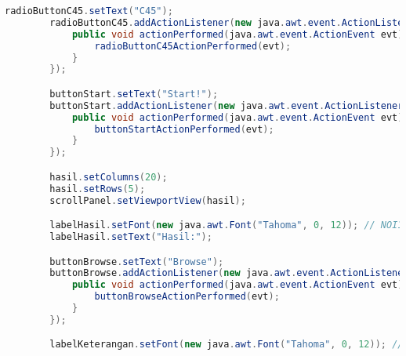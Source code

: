 \begin{lstlisting}[language=Java,basicstyle=\tiny,caption=View.java]
        radioButtonC45.setText("C45");
        radioButtonC45.addActionListener(new java.awt.event.ActionListener() {
            public void actionPerformed(java.awt.event.ActionEvent evt) {
                radioButtonC45ActionPerformed(evt);
            }
        });

        buttonStart.setText("Start!");
        buttonStart.addActionListener(new java.awt.event.ActionListener() {
            public void actionPerformed(java.awt.event.ActionEvent evt) {
                buttonStartActionPerformed(evt);
            }
        });

        hasil.setColumns(20);
        hasil.setRows(5);
        scrollPanel.setViewportView(hasil);

        labelHasil.setFont(new java.awt.Font("Tahoma", 0, 12)); // NOI18N
        labelHasil.setText("Hasil:");

        buttonBrowse.setText("Browse");
        buttonBrowse.addActionListener(new java.awt.event.ActionListener() {
            public void actionPerformed(java.awt.event.ActionEvent evt) {
                buttonBrowseActionPerformed(evt);
            }
        });

        labelKeterangan.setFont(new java.awt.Font("Tahoma", 0, 12)); // NOI18N


\end{lstlisting}
